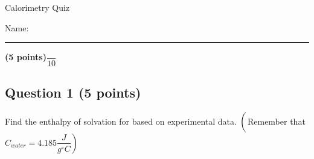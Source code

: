 \documentclass[12pt, letterpaper]{memoir}
\begin{document}
	\begin{center}
		{\large Calorimetry Quiz}
	\end{center}
	{\large Name: \rule[-1mm]{4in}{.1pt} {\bfseries (5 points)}\hspace{4em}$\dfrac{~}{10}$} 
	
	\subsection*{Question 1 (5 points)}
	Find the enthalpy of solvation for  based on experimental data. $\left(\vphantom{\dfrac{J}{g^\circ C}}\right.$Remember that $\left.C_{water}=4.185\dfrac{J}{g^\circ C}\right)$
\end{document}
